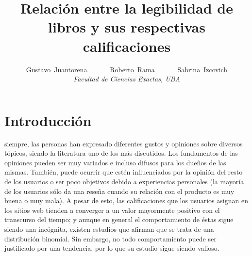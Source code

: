 \documentclass[12pt,journal,compsoc]{IEEEtran}
\begin{document}
\title{Relación entre la legibilidad de libros y sus respectivas calificaciones}

\author{Gustavo~Juantorena~~~~~~
        Roberto~Rama~~~~~~
        Sabrina~Izcovich\\
        \textit{Facultad de Ciencias Exactas, UBA}}



\maketitle
\IEEEdisplaynontitleabstractindextext
\IEEEpeerreviewmaketitle

\section{Introducción}
 siempre, las personas han expresado diferentes gustos y opiniones sobre diversos tópicos, siendo la literatura uno de los más discutidos. Los fundamentos de las opiniones pueden ser muy variados e incluso difusos para los dueños de las mismas. También, puede ocurrir que estén influenciados por la opinión del resto de los usuarios\cite{muchnik} o ser poco objetivos debido a experiencias personales (la mayoría de los usuarios sólo da una reseña cuando su relación con el producto es muy buena o muy mala\cite{hu}). A pesar de esto, las calificaciones que los usuarios asignan en los sitios web tienden a converger a un valor mayormente positivo con el transcurso del tiempo\cite{zhang}; y aunque en general el comportamiento de éstas sigue siendo una incógnita, existen estudios que afirman que se trata de una distribución binomial\cite{hu}. Sin embargo, no todo comportamiento puede ser justificado por una tendencia\cite{zhang}, por lo que su estudio sigue siendo valioso.
\end{document}

